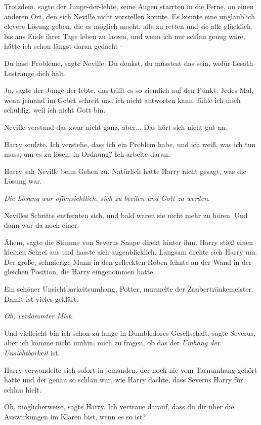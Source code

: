 \glqq Trotzdem\grqq{}, sagte der Junge-der-lebte, seine Augen starrten in die
Ferne, an einen anderen Ort, den sich Neville nicht vorstellen konnte. \glqq Es
könnte eine unglaublich clevere Lösung geben, die es möglich macht, alle zu
retten und sie alle glücklich bis ans Ende ihrer Tage leben zu lassen, und wenn
ich nur schlau genug wäre, hätte ich schon längst daran gedacht -\grqq{}

\glqq Du hast Probleme\grqq{}, sagte Neville. \glqq Du denkst, du müsstest das
sein, wofür Lesath Lestrange dich hält.\grqq{}

\glqq Ja\grqq{}, sagte der Junge-der-lebte, \glqq das trifft es so ziemlich auf
den Punkt. Jedes Mal, wenn jemand im Gebet schreit und ich nicht antworten kann,
fühle ich mich schuldig, weil ich nicht Gott bin.\grqq{}

Neville verstand das zwar nicht ganz, aber... \glqq Das hört sich nicht gut
an.\grqq{}

Harry seufzte. \glqq Ich verstehe, dass ich ein Problem habe, und ich weiß, was
ich tun muss, um es zu lösen, in Ordnung? Ich arbeite daran.\grqq{}

Harry sah Neville beim Gehen zu. Natürlich hatte Harry nicht gesagt, was die
Lösung war.

\emph{Die Lösung war offensichtlich, sich zu beeilen und Gott zu werden}.

Nevilles Schritte entfernten sich, und bald waren sie nicht mehr zu hören. Und
dann war da noch einer.

\glqq Ähem\grqq{}, sagte die Stimme von Severus Snape direkt hinter ihm. Harry
stieß einen kleinen Schrei aus und hasste sich augenblicklich. Langsam drehte
sich Harry um. Der große, schmierige Mann in den gefleckten Roben lehnte an der
Wand in der gleichen Position, die Harry eingenommen hatte.

\glqq Ein schöner Unsichtbarkeitsumhang, Potter\grqq{}, murmelte der
Zaubertränkemeister. \glqq Damit ist vieles geklärt.\grqq{}

\emph{ Oh, verdammter Mist.}

\glqq Und vielleicht bin ich schon zu lange in Dumbledores Gesellschaft\grqq{},
sagte Severus, \glqq aber ich komme nicht umhin, mich zu fragen, ob das der
\emph{Umhang der Unsichtbarkeit} ist.\grqq{}

Harry verwandelte sich sofort in jemanden, der noch nie vom Tarnumhang gehört
hatte und der genau so schlau war, wie Harry dachte, dass Severus Harry für
schlau hielt.

\glqq Oh, möglicherweise\grqq{}, sagte Harry. \glqq Ich vertraue darauf, dass du
dir über die Auswirkungen im Klaren bist, wenn es so ist?\grqq{}

